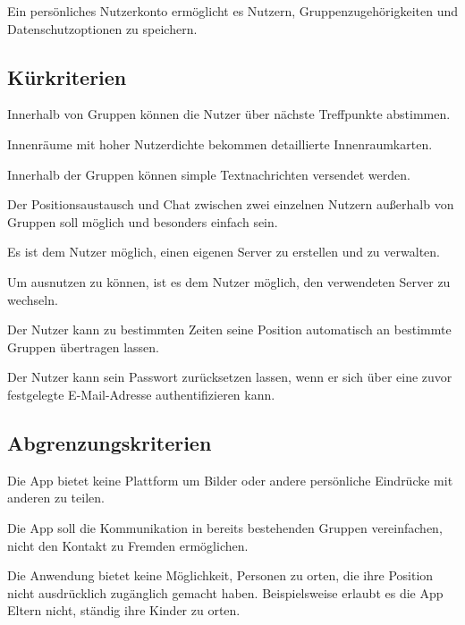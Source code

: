 \documentclass[parskip=full,11pt]{scrartcl}
\begin{document}
Ein persönliches Nutzerkonto ermöglicht es Nutzern,
Gruppenzugehörigkeiten und Datenschutzoptionen zu speichern.

\subsection{Kürkriterien}
Innerhalb von Gruppen können die Nutzer über nächste Treffpunkte abstimmen.

Innenräume mit hoher Nutzerdichte bekommen detaillierte Innenraumkarten.

Innerhalb der Gruppen können simple Textnachrichten versendet werden.

Der Positionsaustausch und Chat zwischen zwei einzelnen Nutzern außerhalb von
Gruppen soll möglich und besonders einfach sein.

Es ist dem Nutzer möglich, einen eigenen Server zu erstellen und zu verwalten.

Um  ausnutzen zu können, ist es dem Nutzer
möglich, den verwendeten Server zu wechseln.

Der Nutzer kann zu bestimmten Zeiten seine Position automatisch an bestimmte
Gruppen übertragen lassen.

\pagebreak
{}
Der Nutzer kann sein Passwort zurücksetzen lassen, wenn er sich über eine zuvor
festgelegte E-Mail-Adresse authentifizieren kann.

\subsection{Abgrenzungskriterien}
Die App bietet keine Plattform um Bilder oder andere persönliche Eindrücke mit
anderen zu teilen.

Die App soll die Kommunikation in bereits bestehenden Gruppen vereinfachen,
nicht den Kontakt zu Fremden ermöglichen.

Die Anwendung bietet keine Möglichkeit, Personen zu orten,
die ihre Position nicht ausdrücklich zugänglich gemacht haben.
Beispielsweise erlaubt es die App Eltern nicht, ständig ihre Kinder zu orten.
\end{document}
